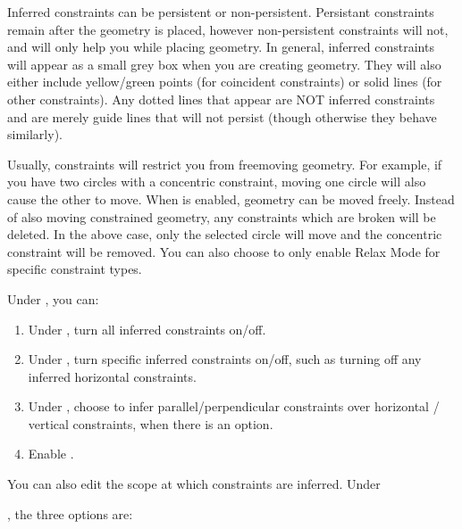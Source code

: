Inferred constraints can be persistent or non-persistent. Persistant constraints remain after the geometry is placed, however non-persistent constraints will not, and will only help you while placing geometry. In general, inferred constraints will appear as a small grey box when you are creating geometry. They will also either include yellow/green points (for coincident constraints) or solid lines (for other constraints). Any dotted lines that appear are NOT inferred constraints and are merely guide lines that will not persist (though otherwise they behave similarly).

Usually, constraints will restrict you from freemoving geometry. For example, if you have two circles with a concentric constraint, moving one circle will also cause the other to move. When  is enabled, geometry can be moved freely. Instead of also moving constrained geometry, any constraints which are broken will be deleted. In the above case, only the selected circle will move and the concentric constraint will be removed. You can also choose to only enable Relax Mode for specific constraint types.

Under , you can:

\begin{enumerate}
    \item Under , turn all inferred constraints on/off.
    \item Under , turn specific inferred constraints on/off, such as turning off any inferred horizontal constraints.
    \item Under , choose to infer parallel/perpendicular constraints over horizontal / vertical constraints, when there is an option.
    \item Enable .
\end{enumerate}

You can also edit the scope at which constraints are inferred. Under 

, the three options are:

